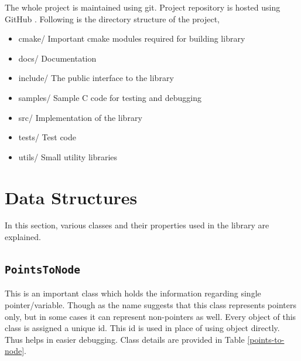 \documentclass[a4paper,12pt]{report}
\begin{document}
The whole project is maintained using git. Project repository is hosted using
GitHub \cite{GitHub}. Following is the directory structure of the project,

\begin{itemize}
  \item cmake/      Important cmake modules required for building library
  \item docs/       Documentation
  \item include/    The public interface to the library
  \item samples/    Sample C code for testing and debugging
  \item src/        Implementation of the library
  \item tests/      Test code
  \item utils/      Small utility libraries
\end{itemize}

\section{Data Structures}
In this section, various classes and their properties used in the library are 
explained.

\subsection{\texttt{PointsToNode}}
This is an important class which holds the information regarding single 
pointer/variable. Though as the name suggests that this class represents 
pointers only, but in some cases it can represent non-pointers as well.
Every object of this class is assigned a unique id. This id is used in place 
of using object directly. Thus helps in easier debugging. Class details are provided in Table \ref{points-to-node}.
\end{document}
